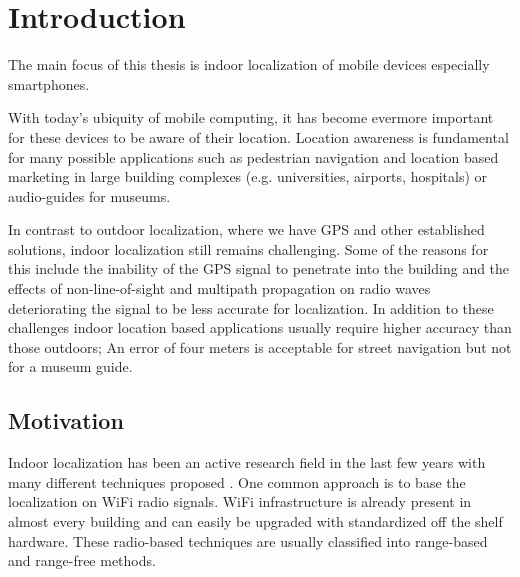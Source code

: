 
\chapter{Introduction} %

\label{Chapter1} %


\newcommand{\keyword}[1]{\textbf{#1}}
\newcommand{\tabhead}[1]{\textbf{#1}}
\newcommand{\code}[1]{\texttt{#1}}
\newcommand{\file}[1]{\texttt{\bfseries#1}}
\newcommand{\option}[1]{\texttt{\itshape#1}}


The main focus of this thesis is indoor localization of mobile devices especially smartphones.

With today's ubiquity of mobile computing, it has become evermore important for these devices to be aware of their location. Location awareness is fundamental for many possible applications such as pedestrian navigation and location based marketing in large building complexes (e.g. universities, airports, hospitals) or audio-guides for museums.

In contrast to outdoor localization, where we have GPS and other established solutions, indoor localization still remains challenging. Some of the reasons for this include the inability of the GPS signal to penetrate into the building and the effects of non-line-of-sight and multipath propagation on radio waves deteriorating the signal to be less accurate for localization\cite{JoseMaster,multipathEffects}. In addition to these challenges indoor location based applications usually require higher accuracy than those outdoors; An error of four meters is acceptable for street navigation but not for a museum guide.

\section{Motivation}

Indoor localization has been an active research field in the last few years with many different techniques proposed \cite{surveyIndoorTechniques,surveyWirelessPersonal}. One common approach is to base the localization on WiFi radio signals. WiFi infrastructure is already present in almost every building and can easily be upgraded with standardized off the shelf hardware. These radio-based techniques are usually classified into range-based and range-free methods\cite{FineGrainedIndoorTracking}.

